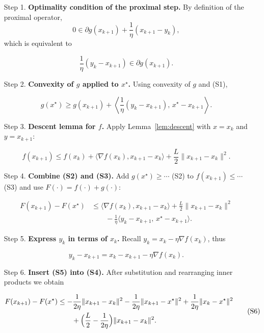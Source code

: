 \documentclass{article}
\begin{document}
\begin{enumerate}
\item[Step 1.] \textbf{Optimality condition of the proximal step.}  
By definition of the proximal operator,
\[
0\in \partial g(x_{k+1})+\frac{1}{\eta}(x_{k+1}-y_{k}),
\]
which is equivalent to  

\[
\frac{1}{\eta}(y_{k}-x_{k+1})\in\partial g(x_{k+1}).
\tag{S1}
\]

\item[Step 2.] \textbf{Convexity of $g$ applied to $x^{\star}$.}  
Using convexity of $g$ and (S1),

\[
g(x^{\star})\ge g(x_{k+1})+\left\langle\frac{1}{\eta}(y_{k}-x_{k+1}),\,x^{\star}-x_{k+1}\right\rangle .
\tag{S2}
\]

\item[Step 3.] \textbf{Descent lemma for $f$.}  
Apply Lemma~\ref{lem:descent} with $x=x_{k}$ and $y=x_{k+1}$:

\[
f(x_{k+1})\le f(x_{k})+\langle\nabla f(x_{k}),x_{k+1}-x_{k}\rangle+\frac{L}{2}\|x_{k+1}-x_{k}\|^{2}.
\tag{S3}
\]

\item[Step 4.] \textbf{Combine (S2) and (S3).}  
Add $g(x^{\star})\ge\cdots$ (S2) to $f(x_{k+1})\le\cdots$ (S3) and use $F(\cdot)=f(\cdot)+g(\cdot)$:

\[
\begin{aligned}
F(x_{k+1})-F(x^{\star})
&\le \langle\nabla f(x_{k}),x_{k+1}-x_{k}\rangle
    +\frac{L}{2}\|x_{k+1}-x_{k}\|^{2}\\
&\qquad -\frac{1}{\eta}\langle y_{k}-x_{k+1},\,x^{\star}-x_{k+1}\rangle .
\end{aligned}
\tag{S4}
\]

\item[Step 5.] \textbf{Express $y_{k}$ in terms of $x_{k}$.}  
Recall $y_{k}=x_{k}-\eta\nabla f(x_{k})$, thus  

\[
y_{k}-x_{k+1}=x_{k}-x_{k+1}-\eta\nabla f(x_{k}).
\tag{S5}
\]

\item[Step 6.] \textbf{Insert (S5) into (S4).}  
After substitution and rearranging inner products we obtain

\[
\begin{aligned}
F(x_{k+1})-F(x^{\star})
&\le -\frac{1}{2\eta}\|x_{k+1}-x_{k}\|^{2}
      -\frac{1}{2\eta}\|x_{k+1}-x^{\star}\|^{2}
      +\frac{1}{2\eta}\|x_{k}-x^{\star}\|^{2}\\
&\qquad+\Bigl(\frac{L}{2}-\frac{1}{2\eta}\Bigr)\|x_{k+1}-x_{k}\|^{2}.
\end{aligned}
\tag{S6}
\]


\end{enumerate}
\end{document}
